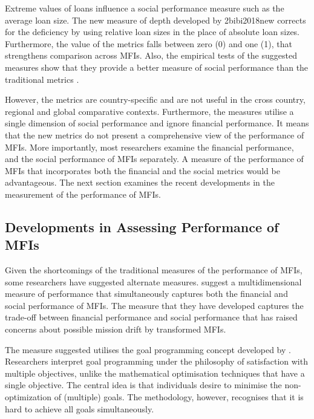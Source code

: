 \documentclass[a4paper, nobind]{templates/ociamthesis}
\begin{document}
Extreme values of loans influence a social performance measure such as the average loan size. The new measure of depth developed by 2bibi2018new corrects for the deficiency by using relative loan sizes in the place of absolute loan sizes. Furthermore, the value of the metrics falls between zero (0) and one (1), that strengthens comparison across MFIs. Also, the empirical tests of the suggested measures show that they provide a better measure of social performance than the traditional metrics \autocite{bibi2018new}.

However, the metrics are country-specific and are not useful in the cross country, regional and global comparative contexts. Furthermore, the measures utilise a single dimension of social performance and ignore financial performance. It means that the new metrics do not present a comprehensive view of the performance of MFIs. More importantly, most researchers examine the financial performance, and the social performance of MFIs separately. A measure of the performance of MFIs that incorporates both the financial and the social metrics would be advantageous. The next section examines the recent developments in the measurement of the performance of MFIs.

\hypertarget{developments-in-assessing-performance-of-mfis}{%
\subsection{Developments in Assessing Performance of MFIs}\label{developments-in-assessing-performance-of-mfis}}

Given the shortcomings of the traditional measures of the performance of MFIs, some researchers have suggested alternate measures. \textcite{cervello2019social} suggest a multidimensional measure of performance that simultaneously captures both the financial and social performance of MFIs. The measure that they have developed captures the trade-off between financial performance and social performance that has raised concerns about possible mission drift by transformed MFIs.

The measure suggested utilises the goal programming concept developed by \autocite{charnes1978measuring}. Researchers interpret goal programming under the philosophy of satisfaction with multiple objectives, unlike the mathematical optimisation techniques that have a single objective. The central idea is that individuals desire to minimise the non-optimization of (multiple) goals. The methodology, however, recognises that it is hard to achieve all goals simultaneously.
\end{document}
